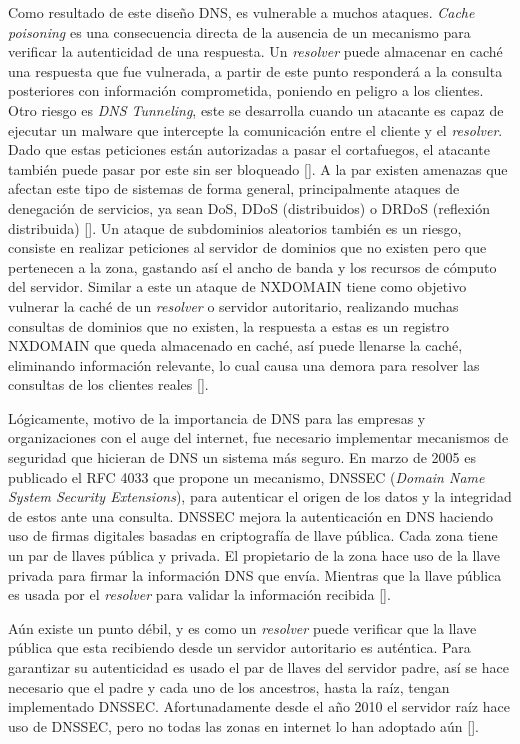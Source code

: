 Como resultado de este diseño DNS, es vulnerable a muchos ataques. \textit{Cache poisoning} es una consecuencia directa de la ausencia de un mecanismo para verificar la autenticidad de una respuesta. Un \textit{resolver} puede almacenar en caché una respuesta que fue vulnerada, a partir de este punto responderá a la consulta posteriores con información comprometida, poniendo en peligro a los clientes. Otro riesgo es \textit{DNS Tunneling}, este se desarrolla cuando un atacante es capaz de ejecutar un malware que intercepte la comunicación entre el cliente y el \textit{resolver}. Dado que estas peticiones están autorizadas a pasar el cortafuegos, el atacante también puede pasar por este sin ser bloqueado [\cite{dns-tunneling}]. A la par existen amenazas que afectan este tipo de sistemas de forma general, principalmente ataques de denegación de servicios, ya sean DoS, DDoS (distribuidos) o DRDoS (reflexión distribuida) [\cite{dns-attacks}]. Un ataque de subdominios aleatorios también es un riesgo, consiste en realizar peticiones al servidor de dominios que no existen pero que pertenecen a la zona, gastando así el ancho de banda y los recursos de cómputo del servidor. Similar a este un ataque de NXDOMAIN tiene como objetivo vulnerar la caché de un \textit{resolver} o servidor autoritario, realizando muchas consultas de dominios que no existen, la respuesta a estas es un registro NXDOMAIN que queda almacenado en caché, así puede llenarse la caché, eliminando información relevante, lo cual causa una demora para resolver las consultas de los clientes reales [\cite{dns-attacks-ident-prot}].

Lógicamente, motivo de la importancia de DNS para las empresas y organizaciones con el auge del internet, fue necesario implementar mecanismos de seguridad que hicieran de DNS un sistema más seguro. En marzo de 2005 es publicado el RFC 4033 que propone un mecanismo, DNSSEC (\textit{Domain Name System Security Extensions}), para autenticar el origen de los datos y la integridad de estos ante una consulta. DNSSEC mejora la autenticación en DNS haciendo uso de firmas digitales basadas en criptografía de llave pública. Cada zona tiene un par de llaves pública y privada. El propietario de la zona hace uso de la llave privada para firmar la información DNS que envía. Mientras que la llave pública es usada por el \textit{resolver} para validar la información recibida [\cite{new-approach-dnssec}].

Aún existe un punto débil, y es como un \textit{resolver} puede verificar que la llave pública que esta recibiendo desde un servidor autoritario es auténtica. Para garantizar su autenticidad es usado el par de llaves del servidor padre, así se hace necesario que el padre y cada uno de los ancestros, hasta la raíz, tengan implementado DNSSEC. Afortunadamente desde el año 2010 el servidor raíz hace uso de DNSSEC, pero no todas las zonas en internet lo han adoptado aún [\cite{dnssec-icann}].

